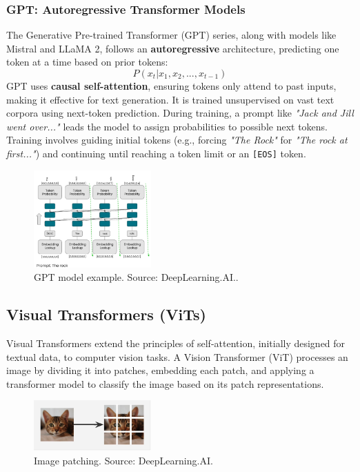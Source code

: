 \subsubsection{GPT: Autoregressive Transformer Models}  
The Generative Pre-trained Transformer (GPT) series, along with models like Mistral and LLaMA 2, follows an \textbf{autoregressive} architecture, predicting one token at a time based on prior tokens:  
\begin{equation}
    P(x_t | x_1, x_2, ..., x_{t-1})
\end{equation}  
GPT uses \textbf{causal self-attention}, ensuring tokens only attend to past inputs, making it effective for text generation. It is trained unsupervised on vast text corpora using next-token prediction. During training, a prompt like \textit{"Jack and Jill went over..."} leads the model to assign probabilities to possible next tokens. Training involves guiding initial tokens (e.g., forcing \textit{"The Rock"} for \textit{"The rock at first..."}) and continuing until reaching a token limit or an \texttt{[EOS]} token.  
\begin{figure}[h]
    \centering
    \includegraphics[width=0.4\textwidth]{IMAGES/immagine_2025-02-26_110808787.png}
    \caption[GPT]{GPT model example. Source: DeepLearning.AI.\footnotemark.}
    \label{fig:GPT model}
\end{figure}
\subsection{Visual Transformers (ViTs)}

Visual Transformers extend the principles of self-attention, initially designed for textual data, to computer vision tasks. A Vision Transformer (ViT) processes an image by dividing it into patches, embedding each patch, and applying a transformer model to classify the image based on its patch representations.

\begin{figure}[h]
    \centering
    \includegraphics[width=0.4\textwidth]{IMAGES/immagine_2025-02-26_112843716.png}
    \caption[Image Patching]{Image patching. Source: DeepLearning.AI.\footnotemark[4]}
    \label{fig: Patching }
\end{figure}

